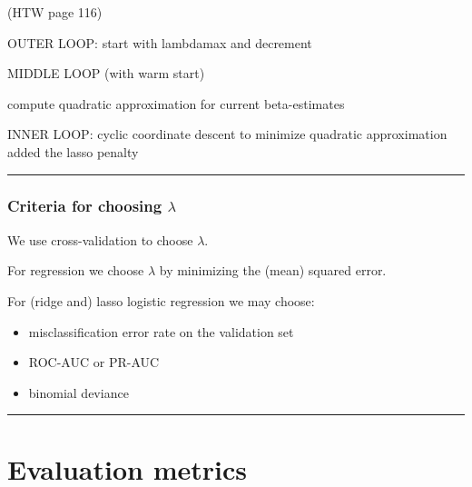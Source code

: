 \documentclass[
  letterpaper,
  DIV=11,
  numbers=noendperiod]{scrartcl}
\newenvironment{Shaded}{\begin{snugshade}}{\end{snugshade}}
\newcommand{\ControlFlowTok}[1]{\textcolor[rgb]{0.00,0.23,0.31}{#1}}
\newcommand{\FunctionTok}[1]{\textcolor[rgb]{0.28,0.35,0.67}{#1}}
\newcommand{\NormalTok}[1]{\textcolor[rgb]{0.00,0.23,0.31}{#1}}
\newcommand{\SpecialCharTok}[1]{\textcolor[rgb]{0.37,0.37,0.37}{#1}}
\providecommand{\tightlist}{%
  \setlength{\itemsep}{0pt}\setlength{\parskip}{0pt}}\usepackage{longtable,booktabs,array}
\begin{document}
(HTW page 116)

\begin{Shaded}
\begin{Highlighting}[]
\NormalTok{OUTER LOOP}\SpecialCharTok{:}\NormalTok{ start with lambdamax and decrement}

\NormalTok{      MIDDLE }\FunctionTok{LOOP}\NormalTok{ (with warm start) }
         
\NormalTok{         compute quadratic approximation }
         \ControlFlowTok{for}\NormalTok{ current beta}\SpecialCharTok{{-}}\NormalTok{estimates}
         
\NormalTok{              INNER LOOP}\SpecialCharTok{:}\NormalTok{ cyclic coordinate descent}
\NormalTok{              to minimize quadratic approximation }
\NormalTok{              added the lasso penalty}
\end{Highlighting}
\end{Shaded}

\begin{center}\rule{0.5\linewidth}{0.5pt}\end{center}

\hypertarget{criteria-for-choosing-lambda}{%
\subsubsection{\texorpdfstring{Criteria for choosing
\(\lambda\)}{Criteria for choosing \textbackslash lambda}}\label{criteria-for-choosing-lambda}}

We use cross-validation to choose \(\lambda\).

For regression we choose \(\lambda\) by minimizing the (mean) squared
error.

For (ridge and) lasso logistic regression we may choose:

\begin{itemize}
\tightlist
\item
  misclassification error rate on the validation set
\item
  ROC-AUC or PR-AUC
\item
  binomial deviance
\end{itemize}

\begin{center}\rule{0.5\linewidth}{0.5pt}\end{center}

\hypertarget{evaluation-metrics}{%
\section{Evaluation metrics}\label{evaluation-metrics}}
\end{document}
